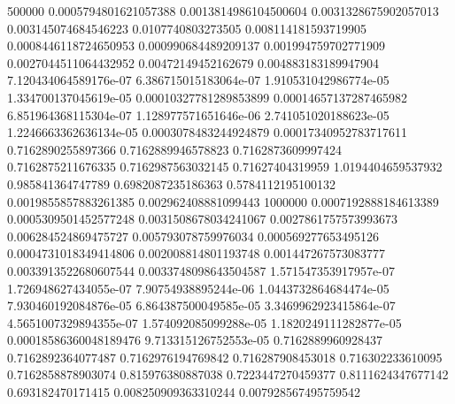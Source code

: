 {500000 0.0005794801621057388 0.0013814986104500604 0.0031328675902057013 0.003145074684546223 0.0107740803273505 0.008114181593719905 0.0008446118724650953 0.000990684489209137 0.001994759702771909 0.0027044511064432952 0.00472149452162679 0.004883183189947904 7.120434064589176e-07 6.386715015183064e-07 1.910531042986774e-05 1.334700137045619e-05 0.00010327781289853899 0.00014657137287465982 6.851964368115304e-07 1.128977571651646e-06 2.741051020188623e-05 1.2246663362636134e-05 0.0003078483244924879 0.00017340952783717611 0.7162890255897366 0.7162889946578823 0.7162873609997424 0.7162875211676335 0.7162987563032145 0.71627404319959 1.0194404659537932 0.985841364747789 0.6982087235186363 0.5784112195100132 0.0019855857883261385 0.002962408881099443
1000000 0.0007192888184613389 0.0005309501452577248 0.0031508678034241067 0.0027861757573993673 0.006284524869475727 0.005793078759976034 0.000569277653495126 0.0004731018349414806 0.002008814801193748 0.001447267573083777 0.0033913522680607544 0.0033748098643504587 1.571547353917957e-07 1.726948627434055e-07 7.90754938895244e-06 1.0443732864684474e-05 7.930460192084876e-05 6.864387500049585e-05 3.3469962923415864e-07 4.5651007329894355e-07 1.574092085099288e-05 1.1820249111282877e-05 0.00018586360048189476 9.713315126752553e-05 0.7162889960928437 0.7162892364077487 0.7162976194769842 0.716287908453018 0.716302233610095 0.7162858878903074 0.815976380887038 0.7223447270459377 0.8111624347677142 0.693182470171415 0.008250909363310244 0.007928567495759542
}\dataA

